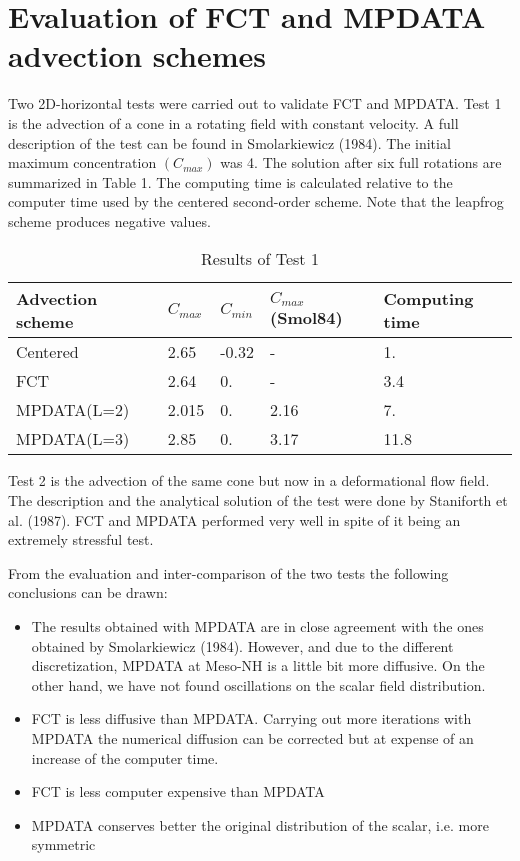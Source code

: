 \section{Evaluation of FCT and MPDATA advection schemes}

Two 2D-horizontal tests were carried out to validate FCT and MPDATA. Test 1 is the
advection of a cone in a rotating field with constant velocity. A full description
of the test can be found in Smolarkiewicz (1984). The initial maximum
concentration $(C_{max})$ was 4. The solution after six full rotations are summarized in Table 1.
The computing time is calculated relative to the computer time used by the centered
second-order
scheme. Note that the leapfrog scheme produces negative values.


\begin{table}[htpb]
  \centering
  \caption{Results of Test 1}
  \begin{tabular}{p{3cm}p{3cm}p{3cm}p{3cm}p{3cm}}
    \hline
    Advection scheme  &  $C_{max}$  &  $C_{min}$  & $C_{max}$(Smol84)  &  Computing time  \\
    \hline
    \hline
    Centered      &   2.65  &  -0.32 &  -    & 1.      \\
    FCT          &   2.64  &   0.   &  -    & 3.4     \\
    MPDATA(L=2)  &   2.015 &   0.   & 2.16  & 7.       \\
    MPDATA(L=3)  &   2.85  &   0.   & 3.17  &11.8      \\
    \hline
  \end{tabular}
\end{table}

Test 2 is the advection of the same cone but now in a deformational flow field. The
description and the analytical solution of the test were done by Staniforth et al. (1987).
FCT and MPDATA performed very well in spite of it being an extremely stressful test.

From the evaluation and inter-comparison of the two tests
the following conclusions can be drawn:

\begin{itemize}

\item{The results obtained with MPDATA are in close agreement with the ones obtained
by Smolarkiewicz (1984). However, and due to the different discretization, MPDATA
at Meso-NH is a little bit more diffusive. On the other hand, we have not found oscillations
on the scalar field distribution.}

\item{FCT is less diffusive than MPDATA. Carrying out more iterations with MPDATA the
numerical diffusion can be corrected but at expense of an increase of the computer time.}

\item{FCT is less computer expensive than MPDATA}

\item{MPDATA conserves better the original distribution of the scalar, i.e. more symmetric}

\end{itemize}



